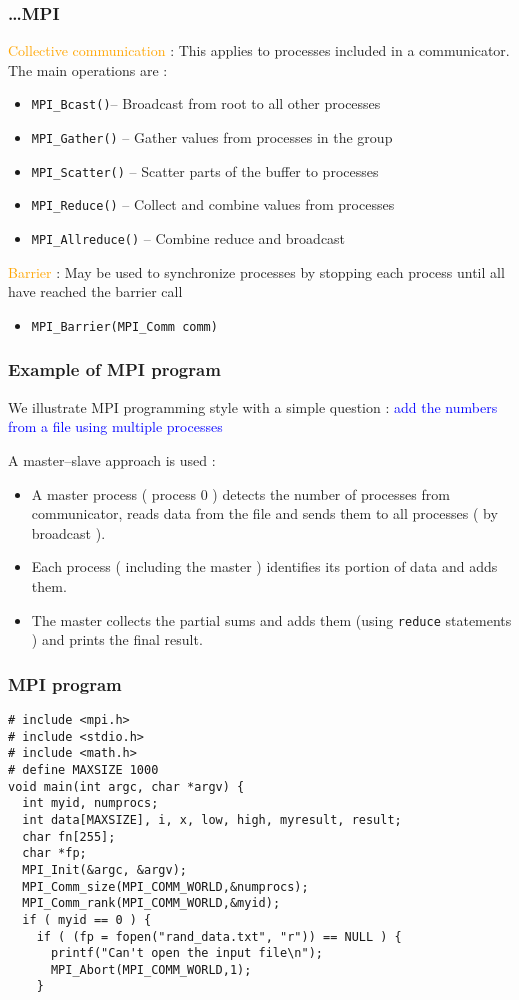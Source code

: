 \documentclass{beamer}
\begin{document}
\begin{frame}
\frametitle{\ldots MPI}

\textcolor{orange}{Collective communication} : This applies to
processes included in a communicator. The main operations are :
\begin{itemize}
\item \alert{\texttt{MPI\_Bcast()}}-- Broadcast from root to all other processes
\item \alert{\texttt{MPI\_Gather()}} -- Gather values from processes in the group
\item \alert{\texttt{MPI\_Scatter()}} -- Scatter parts of the buffer to processes
\item \alert{\texttt{MPI\_Reduce()}} -- Collect and combine values from processes
\item \alert{\texttt{MPI\_Allreduce()}} -- Combine reduce and broadcast
\end{itemize}

\textcolor{orange}{Barrier} : May be used to synchronize processes
by stopping each process until all have reached the barrier call
\begin{itemize}
\item \alert{\texttt{MPI\_Barrier(MPI\_Comm comm)}}
\end{itemize}
\end{frame}

\begin{frame}
\frametitle{Example of MPI program}

We illustrate MPI programming style with a simple question :
\textcolor{blue}{\rm add the numbers from a file using multiple
processes}

A master--slave approach is used :
\begin{itemize}
\item A master process ( process 0 ) detects the number of processes
from communicator, reads data from the file and sends them to
all processes ( by broadcast ).
\item Each process ( including the master ) identifies its portion
of data and adds them.
\item The master collects the partial sums and adds them
(using \texttt{reduce} statements ) and prints the final result.
\end{itemize}
\end{frame}

\begin{frame}[fragile]
\frametitle{MPI program}
\begin{lstlisting}
# include <mpi.h>
# include <stdio.h>
# include <math.h>
# define MAXSIZE 1000
void main(int argc, char *argv) {
  int myid, numprocs;
  int data[MAXSIZE], i, x, low, high, myresult, result;
  char fn[255];
  char *fp;
  MPI_Init(&argc, &argv);
  MPI_Comm_size(MPI_COMM_WORLD,&numprocs);
  MPI_Comm_rank(MPI_COMM_WORLD,&myid);
  if ( myid == 0 ) {
    if ( (fp = fopen("rand_data.txt", "r")) == NULL ) {
      printf("Can't open the input file\n");
      MPI_Abort(MPI_COMM_WORLD,1);
    }    
\end{lstlisting}
\end{frame}
\end{document}
